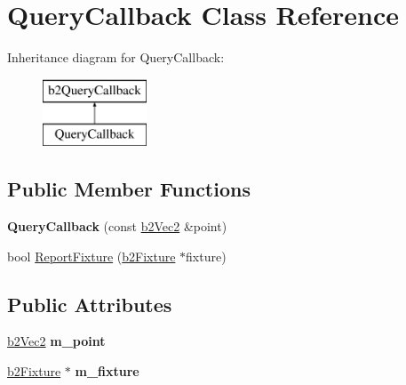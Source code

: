 \hypertarget{class_query_callback}{\section{Query\-Callback Class Reference}
\label{class_query_callback}
}
Inheritance diagram for Query\-Callback\-:\begin{figure}[H]
\begin{center}
\leavevmode
\includegraphics[height=2.000000cm]{class_query_callback}
\end{center}
\end{figure}
\subsection*{Public Member Functions}
\begin{DoxyCompactItemize}
\item 
\hypertarget{class_query_callback_a9c15d04aa8895b319f93e6c9af1c59f6}{{\bfseries Query\-Callback} (const \hyperlink{structb2_vec2}{b2\-Vec2} \&point)}\label{class_query_callback_a9c15d04aa8895b319f93e6c9af1c59f6}

\item 
bool \hyperlink{class_query_callback_ac79cf9e2008bdea68ab3d9d64811dc62}{Report\-Fixture} (\hyperlink{classb2_fixture}{b2\-Fixture} $\ast$fixture)
\end{DoxyCompactItemize}
\subsection*{Public Attributes}
\begin{DoxyCompactItemize}
\item 
\hypertarget{class_query_callback_a40f98612c1a6d7eeb57a3451b4898cda}{\hyperlink{structb2_vec2}{b2\-Vec2} {\bfseries m\-\_\-point}}\label{class_query_callback_a40f98612c1a6d7eeb57a3451b4898cda}

\item 
\hypertarget{class_query_callback_acf7997f35f4f35b82a2aa6a9b3bd66db}{\hyperlink{classb2_fixture}{b2\-Fixture} $\ast$ {\bfseries m\-\_\-fixture}}\label{class_query_callback_acf7997f35f4f35b82a2aa6a9b3bd66db}

\end{DoxyCompactItemize}


